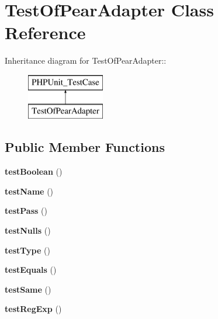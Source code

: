 \hypertarget{class_test_of_pear_adapter}{
\section{TestOfPearAdapter Class Reference}
\label{class_test_of_pear_adapter}
}
Inheritance diagram for TestOfPearAdapter::\begin{figure}[H]
\begin{center}
\leavevmode
\includegraphics[height=2cm]{class_test_of_pear_adapter}
\end{center}
\end{figure}
\subsection*{Public Member Functions}
\begin{DoxyCompactItemize}
\item 
\hypertarget{class_test_of_pear_adapter_a9328058a4ee2c11717e0105ecf207ccd}{
{\bfseries testBoolean} ()}
\label{class_test_of_pear_adapter_a9328058a4ee2c11717e0105ecf207ccd}

\item 
\hypertarget{class_test_of_pear_adapter_a867895aeb881d8873d4694586532e8d1}{
{\bfseries testName} ()}
\label{class_test_of_pear_adapter_a867895aeb881d8873d4694586532e8d1}

\item 
\hypertarget{class_test_of_pear_adapter_abebce761620e8ea42701dd5a3250738d}{
{\bfseries testPass} ()}
\label{class_test_of_pear_adapter_abebce761620e8ea42701dd5a3250738d}

\item 
\hypertarget{class_test_of_pear_adapter_a2e2a43b656ada7464140377de108877a}{
{\bfseries testNulls} ()}
\label{class_test_of_pear_adapter_a2e2a43b656ada7464140377de108877a}

\item 
\hypertarget{class_test_of_pear_adapter_a9a19b674c7574e192505f8edad9c74bb}{
{\bfseries testType} ()}
\label{class_test_of_pear_adapter_a9a19b674c7574e192505f8edad9c74bb}

\item 
\hypertarget{class_test_of_pear_adapter_ad504db0164034e1d6ea40d5a8312d3e3}{
{\bfseries testEquals} ()}
\label{class_test_of_pear_adapter_ad504db0164034e1d6ea40d5a8312d3e3}

\item 
\hypertarget{class_test_of_pear_adapter_ae4376615ca50b60780803fa9a41087ff}{
{\bfseries testSame} ()}
\label{class_test_of_pear_adapter_ae4376615ca50b60780803fa9a41087ff}

\item 
\hypertarget{class_test_of_pear_adapter_a27a2ebfff38f7adf8053bba43c76adfe}{
{\bfseries testRegExp} ()}
\label{class_test_of_pear_adapter_a27a2ebfff38f7adf8053bba43c76adfe}

\end{DoxyCompactItemize}


